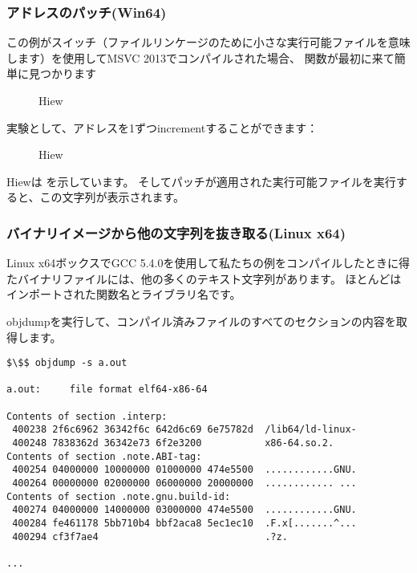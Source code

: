 \subsubsection{アドレスのパッチ(Win64)}

この例がスイッチ（ファイルリンケージのために小さな実行可能ファイルを意味します）を使用してMSVC 2013でコンパイルされた場合、 \main 関数が最初に来て簡単に見つかります

\begin{figure}[H]
\centering
{}
\caption{Hiew}
\label{}
\end{figure}

実験として、アドレスを1ずつ\gls{increment}することができます：

\begin{figure}[H]
\centering
{}
\caption{Hiew}
\label{}
\end{figure}

Hiewは を示しています。 そしてパッチが適用された実行可能ファイルを実行すると、この文字列が表示されます。

\subsubsection{バイナリイメージから他の文字列を抜き取る(Linux x64)}

Linux x64ボックスでGCC 5.4.0を使用して私たちの例をコンパイルしたときに得たバイナリファイルには、他の多くのテキスト文字列があります。
ほとんどはインポートされた関数名とライブラリ名です。

objdumpを実行して、コンパイル済みファイルのすべてのセクションの内容を取得します。

\begin{lstlisting}[basicstyle=\ttfamily, mathescape]
$\$$ objdump -s a.out

a.out:     file format elf64-x86-64

Contents of section .interp:
 400238 2f6c6962 36342f6c 642d6c69 6e75782d  /lib64/ld-linux-
 400248 7838362d 36342e73 6f2e3200           x86-64.so.2.
Contents of section .note.ABI-tag:
 400254 04000000 10000000 01000000 474e5500  ............GNU.
 400264 00000000 02000000 06000000 20000000  ............ ...
Contents of section .note.gnu.build-id:
 400274 04000000 14000000 03000000 474e5500  ............GNU.
 400284 fe461178 5bb710b4 bbf2aca8 5ec1ec10  .F.x[.......^...
 400294 cf3f7ae4                             .?z.

...
\end{lstlisting}

